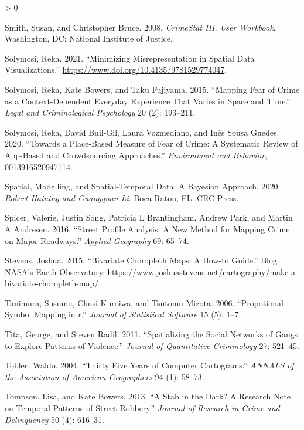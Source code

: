 \documentclass[
  krantz2]{krantz}
\newlength{\cslhangindent}
\newenvironment{CSLReferences}[2] %
 {%
  \setlength{\parindent}{0pt}
  \ifodd #1 \everypar{\setlength{\hangindent}{\cslhangindent}}\ignorespaces\fi
  \ifnum #2 > 0
  \setlength{\parskip}{#2\baselineskip}
  \fi
 }%
 {}
\begin{document}
\begin{CSLReferences}{1}{0}
\leavevmode\hypertarget{ref-Smith_2008}{}%
Smith, Susan, and Christopher Bruce. 2008. \emph{CrimeStat III. User Workbook}. Washington, DC: National Institute of Justice.

\leavevmode\hypertarget{ref-Solymosi_2021}{}%
Solymosi, Reka. 2021. {``Minimizing Misrepresentation in Spatial Data Visualizations.''} \url{https://www.doi.org/10.4135/9781529774047}.

\leavevmode\hypertarget{ref-Solymosi_2015}{}%
Solymosi, Reka, Kate Bowers, and Taku Fujiyama. 2015. {``Mapping Fear of Crime as a Context-Dependent Everyday Experience That Varies in Space and Time.''} \emph{Legal and Criminological Psychology} 20 (2): 193--211.

\leavevmode\hypertarget{ref-Solymosi_2020}{}%
Solymosi, Reka, David Buil-Gil, Laura Vozmediano, and Inês Sousa Guedes. 2020. {``Towards a Place-Based Measure of Fear of Crime: A Systematic Review of App-Based and Crowdsourcing Approaches.''} \emph{Environment and Behavior}, 0013916520947114.

\leavevmode\hypertarget{ref-Haining_2020}{}%
Spatial, Modelling, and Spatial-Temporal Data: A Bayesian Approach. 2020. \emph{Robert Haining and Guangquan Li}. Boca Raton, FL: CRC Press.

\leavevmode\hypertarget{ref-Spicer_2016}{}%
Spicer, Valerie, Justin Song, Patricia L Brantingham, Andrew Park, and Martin A Andresen. 2016. {``Street Profile Analysis: A New Method for Mapping Crime on Major Roadways.''} \emph{Applied Geography} 69: 65--74.

\leavevmode\hypertarget{ref-Stevens_2015}{}%
Stevens, Joshua. 2015. {``Bivariate Choropleth Maps: A How-to Guide.''} Blog. NASA's Earth Observatory. \url{https://www.joshuastevens.net/cartography/make-a-bivariate-choropleth-map/}.

\leavevmode\hypertarget{ref-Tanimura_2006}{}%
Tanimura, Susumu, Chusi Kuroiwa, and Tsutomu Mizota. 2006. {``Propotional Symbol Mapping in r.''} \emph{Journal of Statistical Software} 15 (5): 1--7.

\leavevmode\hypertarget{ref-Tita_2011}{}%
Tita, George, and Steven Radil. 2011. {``Spatializing the Social Networks of Gangs to Explore Patterns of Violence.''} \emph{Journal of Quantitative Criminology} 27: 521--45.

\leavevmode\hypertarget{ref-Tobler_2004}{}%
Tobler, Waldo. 2004. {``Thirty Five Years of Computer Cartograms.''} \emph{ANNALS of the Association of American Geographers} 94 (1): 58--73.

\leavevmode\hypertarget{ref-Tompson_2013}{}%
Tompson, Lisa, and Kate Bowers. 2013. {``A Stab in the Dark? A Research Note on Temporal Patterns of Street Robbery.''} \emph{Journal of Research in Crime and Delinquency} 50 (4): 616--31.


\end{CSLReferences}
\end{document}
